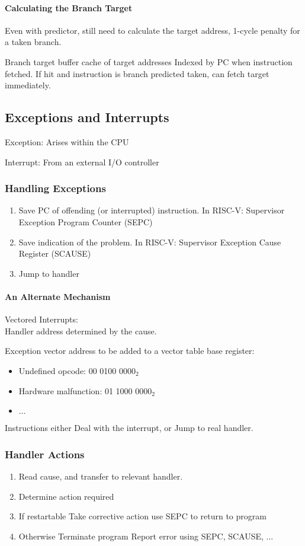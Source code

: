 \paragraph{Calculating the Branch Target}
Even with predictor, still need to calculate the target address, 1-cycle penalty for a taken branch. 

Branch target buffer cache of target addresses Indexed by PC when instruction fetched. If hit and instruction is branch predicted taken, can fetch target immediately. 

\subsection{Exceptions and Interrupts}
Exception: Arises within the CPU

Interrupt: From an external I/O controller

\subsubsection{Handling Exceptions}
\begin{enumerate}\small
    \item Save PC of offending (or interrupted) instruction. In RISC-V: Supervisor Exception Program Counter (SEPC)
    \item Save indication of the problem. In RISC-V: Supervisor Exception Cause Register (SCAUSE)
    \item Jump to handler
\end{enumerate}

\paragraph{An Alternate Mechanism}
Vectored Interrupts:\\ Handler address determined by the cause. 

Exception vector address to be added to a vector table base register:
\begin{itemize}\small
    \item Undefined opcode: 00 0100 0000${}_2$
    \item Hardware malfunction: 01 1000 0000${}_2$
    \item $\dots$
\end{itemize}

Instructions either Deal with the interrupt, or Jump to real handler. 

\subsubsection{Handler Actions}
\begin{enumerate}\small
    \item Read cause, and transfer to relevant handler. 
    \item Determine action required
    \item If restartable
    \subitem Take corrective action
    \subitem use SEPC to return to program
    \item Otherwise
    \subitem Terminate program
    \subitem Report error using SEPC, SCAUSE, ...
\end{enumerate}

